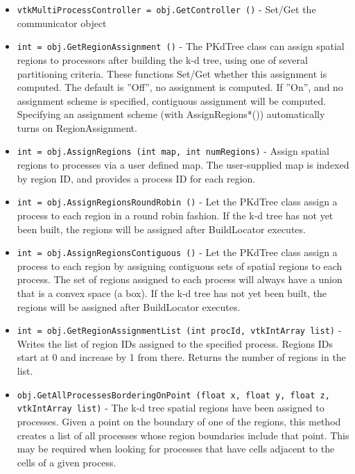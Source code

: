 \begin{itemize}
\item  \verb|vtkMultiProcessController = obj.GetController ()| -    Set/Get the communicator object

\item  \verb|int = obj.GetRegionAssignment ()| -    The PKdTree class can assign spatial regions to processors after
   building the k-d tree, using one of several partitioning criteria.
   These functions Set/Get whether this assignment is computed. 
   The default is ''Off'', no assignment is computed.   If ''On'', and
   no assignment scheme is specified, contiguous assignment will be
   computed.  Specifying an assignment scheme (with AssignRegions*())
   automatically turns on RegionAssignment.

\item  \verb|int = obj.AssignRegions (int map, int numRegions)| -    Assign spatial regions to processes via a user defined map.
   The user-supplied map is indexed by region ID, and provides a
   process ID for each region. 

\item  \verb|int = obj.AssignRegionsRoundRobin ()| -    Let the PKdTree class assign a process to each region in a
   round robin fashion.  If the k-d tree has not yet been
   built, the regions will be assigned after BuildLocator executes.

\item  \verb|int = obj.AssignRegionsContiguous ()| -     Let the PKdTree class assign a process to each region
    by assigning contiguous sets of spatial regions to each
    process.  The set of regions assigned to each process will
    always have a union that is a convex space (a box).
    If the k-d tree has not yet been built, the regions
    will be assigned after BuildLocator executes.

\item  \verb|int = obj.GetRegionAssignmentList (int procId, vtkIntArray list)| -     Writes the list of region IDs assigned to the specified
    process.  Regions IDs start at 0 and increase by 1 from there.
    Returns the number of regions in the list. 

\item  \verb|obj.GetAllProcessesBorderingOnPoint (float x, float y, float z, vtkIntArray list)| -     The k-d tree spatial regions have been assigned to processes.
    Given a point on the boundary of one of the regions, this
    method creates a list of all processes whose region
    boundaries include that point.  This may be required when
    looking for processes that have cells adjacent to the cells
    of a given process.


\end{itemize}
